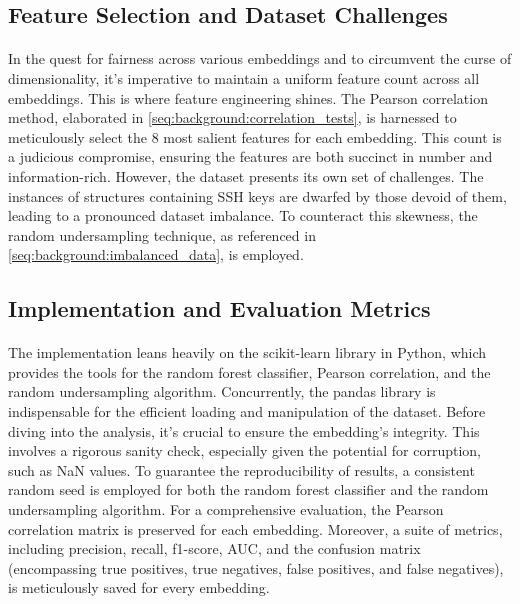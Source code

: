 \subsection{Feature Selection and Dataset Challenges}

\paragraph{}In the quest for fairness across various embeddings and to circumvent the curse of dimensionality, it's imperative to maintain a uniform feature count across all embeddings. This is where feature engineering shines. The Pearson correlation method, elaborated in \ref{seq:background:correlation_tests}, is harnessed to meticulously select the 8 most salient features for each embedding. This count is a judicious compromise, ensuring the features are both succinct in number and information-rich. However, the dataset presents its own set of challenges. The instances of \glspl{structure} containing SSH keys are dwarfed by those devoid of them, leading to a pronounced dataset imbalance. To counteract this skewness, the random undersampling technique, as referenced in \ref{seq:background:imbalanced_data}, is employed.

\subsection{Implementation and Evaluation Metrics}

\paragraph{}The implementation leans heavily on the scikit-learn library \cite{pedregosa_scikit-learn_2011} in Python, which provides the tools for the random forest classifier, Pearson correlation, and the random undersampling algorithm. Concurrently, the pandas library is indispensable for the efficient loading and manipulation of the dataset. Before diving into the analysis, it's crucial to ensure the embedding's integrity. This involves a rigorous sanity check, especially given the potential for corruption, such as NaN values. To guarantee the reproducibility of results, a consistent random seed is employed for both the random forest classifier and the random undersampling algorithm. For a comprehensive evaluation, the Pearson correlation matrix is preserved for each embedding. Moreover, a suite of metrics, including precision, recall, f1-score, AUC, and the confusion matrix (encompassing true positives, true negatives, false positives, and false negatives), is meticulously saved for every embedding.

